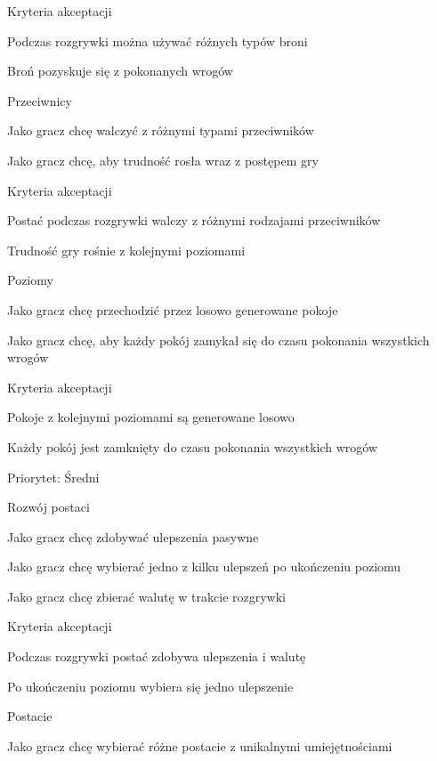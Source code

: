 Kryteria akceptacji \begin{DoxyVerb}Podczas rozgrywki można używać różnych typów broni 

Broń pozyskuje się z pokonanych wrogów 
\end{DoxyVerb}


Przeciwnicy \begin{DoxyVerb}Jako gracz chcę walczyć z różnymi typami przeciwników 

Jako gracz chcę, aby trudność rosła wraz z postępem gry 
\end{DoxyVerb}


Kryteria akceptacji \begin{DoxyVerb}Postać podczas rozgrywki walczy z różnymi rodzajami przeciwników 

Trudność gry rośnie z kolejnymi poziomami 
\end{DoxyVerb}


Poziomy \begin{DoxyVerb}Jako gracz chcę przechodzić przez losowo generowane pokoje 

Jako gracz chcę, aby każdy pokój zamykał się do czasu pokonania wszystkich wrogów 
\end{DoxyVerb}


Kryteria akceptacji \begin{DoxyVerb}Pokoje z kolejnymi poziomami są generowane losowo 

Każdy pokój jest zamknięty do czasu pokonania wszystkich wrogów 
\end{DoxyVerb}


Priorytet:\+ Średni

Rozwój postaci \begin{DoxyVerb}Jako gracz chcę zdobywać ulepszenia pasywne 

Jako gracz chcę wybierać jedno z kilku ulepszeń po ukończeniu poziomu 

Jako gracz chcę zbierać walutę w trakcie rozgrywki 
\end{DoxyVerb}


Kryteria akceptacji \begin{DoxyVerb}Podczas rozgrywki postać zdobywa ulepszenia i walutę 

Po ukończeniu poziomu wybiera się jedno ulepszenie 
\end{DoxyVerb}


Postacie \begin{DoxyVerb}Jako gracz chcę wybierać różne postacie z unikalnymi umiejętnościami 
\end{DoxyVerb}



